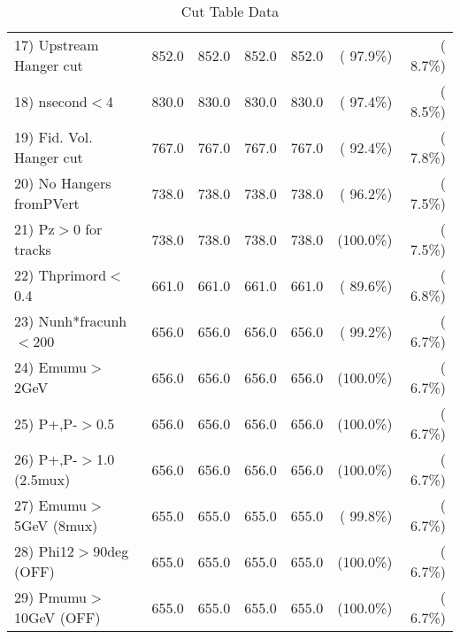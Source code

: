 \begin{table}[h!]
\begin{tabular}{||l||r|r|r|r|r|r||}
 17) Upstream Hanger cut  &        852.0 &        852.0 &        852.0 &        852.0 & ( 97.9\%) & (  8.7\%) \\
 18) nsecond$<$4          &        830.0 &        830.0 &        830.0 &        830.0 & ( 97.4\%) & (  8.5\%) \\
 19) Fid. Vol. Hanger cut &        767.0 &        767.0 &        767.0 &        767.0 & ( 92.4\%) & (  7.8\%) \\
 20) No Hangers fromPVert &        738.0 &        738.0 &        738.0 &        738.0 & ( 96.2\%) & (  7.5\%) \\
 21) Pz$>$0 for tracks    &        738.0 &        738.0 &        738.0 &        738.0 & (100.0\%) & (  7.5\%) \\
 22) Thprimord$<$0.4      &        661.0 &        661.0 &        661.0 &        661.0 & ( 89.6\%) & (  6.8\%) \\
 23) Nunh*fracunh$<$200   &        656.0 &        656.0 &        656.0 &        656.0 & ( 99.2\%) & (  6.7\%) \\
 24) Emumu$>$2GeV         &        656.0 &        656.0 &        656.0 &        656.0 & (100.0\%) & (  6.7\%) \\
 25) P+,P-$>$0.5          &        656.0 &        656.0 &        656.0 &        656.0 & (100.0\%) & (  6.7\%) \\
 26) P+,P-$>$1.0 (2.5mux) &        656.0 &        656.0 &        656.0 &        656.0 & (100.0\%) & (  6.7\%) \\
 27) Emumu$>$5GeV  (8mux) &        655.0 &        655.0 &        655.0 &        655.0 & ( 99.8\%) & (  6.7\%) \\
 28) Phi12$>$90deg  (OFF) &        655.0 &        655.0 &        655.0 &        655.0 & (100.0\%) & (  6.7\%) \\
 29) Pmumu$>$10GeV  (OFF) &        655.0 &        655.0 &        655.0 &        655.0 & (100.0\%) & (  6.7\%) \\
 \hline
 \hline
 \end{tabular}
 \caption{Cut Table  Data     }
 \label{tab-cutcohjpsi-mumu_data}
 \end{table}
